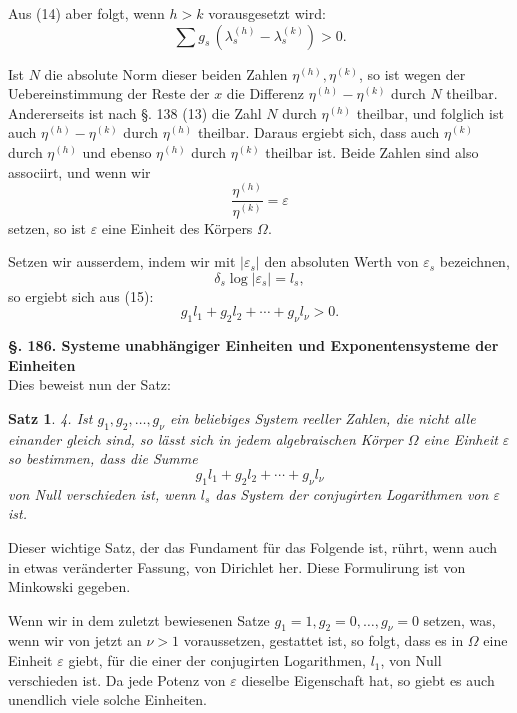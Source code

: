 \documentclass[12pt,a4paper]{article}
\newtheorem*{satz}{Satz}
\begin{document}
Aus (14) aber folgt, wenn $h > k$ vorausgesetzt wird:
\begin{equation}\label{eq:185-15}
\sum g_s\,(\lambda_s^{(h)} - \lambda_s^{(k)}) > 0.
\end{equation}

Ist $N$ die absolute Norm dieser beiden Zahlen $\eta^{(h)}, \eta^{(k)}$, so ist wegen der Uebereinstimmung der Reste der $x$ die Differenz $\eta^{(h)} - \eta^{(k)}$ durch $N$ theilbar. Andererseits ist nach \S. 138 (13) die Zahl $N$ durch $\eta^{(h)}$ theilbar, und folglich ist auch $\eta^{(h)} - \eta^{(k)}$ durch $\eta^{(h)}$ theilbar. Daraus ergiebt sich, dass auch $\eta^{(k)}$ durch $\eta^{(h)}$ und ebenso $\eta^{(h)}$ durch $\eta^{(k)}$ theilbar ist. Beide Zahlen sind also associirt, und wenn wir
\[
\frac{\eta^{(h)}}{\eta^{(k)}} = \varepsilon
\]
setzen, so ist $\varepsilon$ eine Einheit des Körpers $\Omega$.

Setzen wir ausserdem, indem wir mit $|\varepsilon_s|$ den absoluten Werth von $\varepsilon_s$ bezeichnen,
\begin{equation}\label{eq:185-16}
\delta_s \log|\varepsilon_s| = l_s,
\end{equation}
so ergiebt sich aus (15):
\begin{equation}\label{eq:185-17}
g_1 l_1 + g_2 l_2 + \cdots + g_\nu l_\nu > 0.
\end{equation}

\bigskip\noindent\textbf{\S. 186. Systeme unabhängiger Einheiten und Exponentensysteme der Einheiten}\\[4pt]

Dies beweist nun der Satz:

\begin{satz}
4. Ist $g_1, g_2, \ldots, g_\nu$ ein beliebiges System reeller Zahlen, die nicht alle einander gleich sind, so lässt sich in jedem algebraischen Körper $\Omega$ eine Einheit $\varepsilon$ so bestimmen, dass die Summe
\[
g_1 l_1 + g_2 l_2 + \cdots + g_\nu l_\nu
\]
von Null verschieden ist, wenn $l_s$ das System der conjugirten Logarithmen von $\varepsilon$ ist.
\end{satz}

Dieser wichtige Satz, der das Fundament für das Folgende ist, rührt, wenn auch in etwas veränderter Fassung, von Dirichlet her. Diese Formulirung ist von Minkowski gegeben.

Wenn wir in dem zuletzt bewiesenen Satze $g_1 = 1, g_2 = 0, \ldots, g_\nu = 0$ setzen, was, wenn wir von jetzt an $\nu > 1$ voraussetzen, gestattet ist, so folgt, dass es in $\Omega$ eine Einheit $\varepsilon$ giebt, für die einer der conjugirten Logarithmen, $l_1$, von Null verschieden ist. Da jede Potenz von $\varepsilon$ dieselbe Eigenschaft hat, so giebt es auch unendlich viele solche Einheiten.
\end{document}
